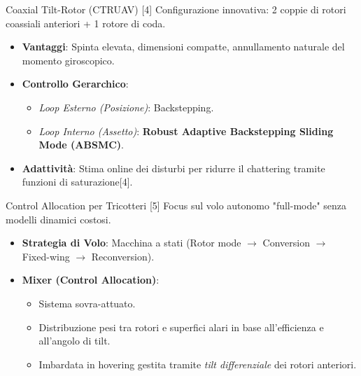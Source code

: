 \documentclass[aspectratio=169]{beamer}
\begin{document}
\begin{frame}{Coaxial Tilt-Rotor (CTRUAV) [4]}
    Configurazione innovativa: 2 coppie di rotori coassiali anteriori + 1 rotore di coda.
    \vspace{0.2cm}
    \begin{itemize}
        \item \textbf{Vantaggi}: Spinta elevata, dimensioni compatte, annullamento naturale del momento giroscopico.
        \item \textbf{Controllo Gerarchico}:
        \begin{itemize}
            \item \textit{Loop Esterno (Posizione)}: Backstepping.
            \item \textit{Loop Interno (Assetto)}: \textbf{Robust Adaptive Backstepping Sliding Mode (ABSMC)}.
        \end{itemize}
        \item \textbf{Adattività}: Stima online dei disturbi per ridurre il chattering tramite funzioni di saturazione[4].
    \end{itemize}
\end{frame}

\begin{frame}{Control Allocation per Tricotteri [5]}
    Focus sul volo autonomo "full-mode" senza modelli dinamici costosi.
    \vspace{0.3cm}
    \begin{itemize}
        \item \textbf{Strategia di Volo}: Macchina a stati (Rotor mode $\to$ Conversion $\to$ Fixed-wing $\to$ Reconversion).
        \item \textbf{Mixer (Control Allocation)}:
        \begin{itemize}
            \item Sistema sovra-attuato.
            \item Distribuzione pesi tra rotori e superfici alari in base all'efficienza e all'angolo di tilt.
            \item Imbardata in hovering gestita tramite \textit{tilt differenziale} dei rotori anteriori.
        \end{itemize}
    \end{itemize}
\end{frame}
\end{document}
